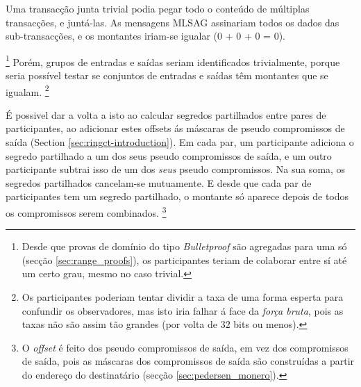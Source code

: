 Uma transacção junta trivial podia pegar todo o conteúdo de múltiplas transacções, e juntá-las. As mensagens MLSAG assinariam todos os dados das sub-transacções, e os montantes iriam-se igualar (0 + 0 + 0 = 0).    

\footnote{Desde que provas de domínio do tipo {\em Bulletproof} são agregadas para uma só (secção \ref{sec:range_proofs}), os participantes teriam de colaborar entre sí até um certo grau, mesmo no caso trivial.}
Porém, grupos de entradas e saídas seriam identificados trivialmente, porque seria possível testar se conjuntos de entradas e saídas têm montantes que se igualam. 
\footnote{Os participantes poderiam tentar dividir a taxa de uma forma esperta para confundir os observadores, mas isto iria falhar á face da {\em força bruta}, pois as taxas não são assim tão grandes (por volta de 32 bits ou menos).} 

É possivel dar a volta a isto ao calcular segredos partilhados entre pares de participantes, ao adicionar estes offsets ás máscaras de pseudo compromissos de saída
(Section \ref{sec:ringct-introduction}). Em cada par, um participante adiciona o segredo partilhado a um dos seus pseudo compromissos de saída, e um outro participante subtrai isso de um dos {\em seus} pseudo compromissos. Na sua soma, os segredos partilhados cancelam-se mutuamente.
\newline E desde que cada par de participantes tem um segredo partilhado, o montante só aparece depois de todos os compromissos serem combinados.    
\footnote{O {\em offset} é feito dos pseudo compromissos de saída, em vez dos compromissos de saída, pois as máscaras dos compromissos de saída são construídas a partir do endereço do destinatário (secção \ref{sec:pedersen_monero}).}

